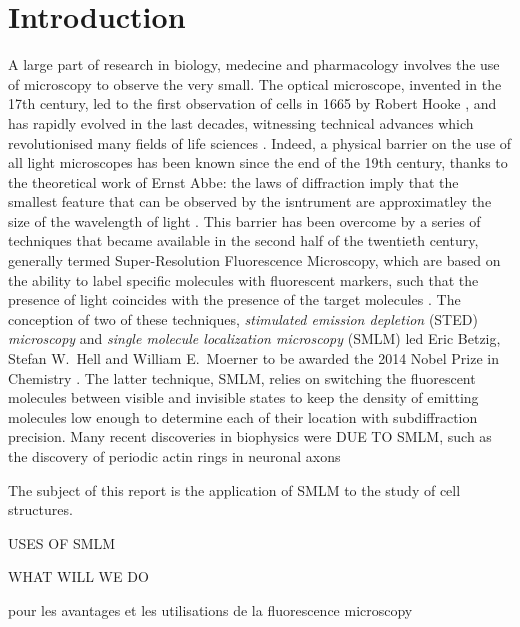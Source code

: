 \section{Introduction}
A large part of research in biology, medecine and pharmacology involves the use of microscopy to observe the very small.
The optical microscope, invented in the 17th century, led to the first observation of cells in 1665 by Robert Hooke \cite{reigoto_comparative_2021}, and has rapidly evolved in the last decades, witnessing technical advances which revolutionised many fields of life sciences \cite{balasubramanian_imagining_2023}.
Indeed, a physical barrier on the use of all light microscopes has been known since the end of the 19th century, thanks to the theoretical work of Ernst Abbe: the laws of diffraction imply that the smallest feature that can be observed by the isntrument are approximatley the size of the wavelength of light \cite{diaspro_fundamentals_2011}.
This barrier has been overcome by a series of techniques that became available in the second half of the twentieth century, generally termed Super-Resolution Fluorescence Microscopy, which are based on the ability to label specific molecules with fluorescent markers, such that the presence of light coincides with the presence of the target molecules \cite{douglass_notice_2023}.
The conception of two of these techniques, \emph{stimulated emission depletion} (STED) \emph{microscopy} and \emph{single molecule localization microscopy} (SMLM) led Eric Betzig, Stefan W.~Hell and William E.~Moerner to be awarded the 2014 Nobel Prize in Chemistry \cite{nobel_press_2014}.
The latter technique, SMLM, relies on switching the fluorescent molecules between visible and invisible states to keep the density of emitting molecules low enough to determine each of their location with subdiffraction precision.
Many recent discoveries in biophysics were DUE TO SMLM, such as the discovery of periodic actin rings in neuronal axons \cite{baddeley_biological_2018}


The subject of this report is the application of SMLM to the study of cell structures.

USES OF SMLM

WHAT WILL WE DO

\cite{sachl_introduction_2022} pour les avantages et les utilisations de la fluorescence microscopy
